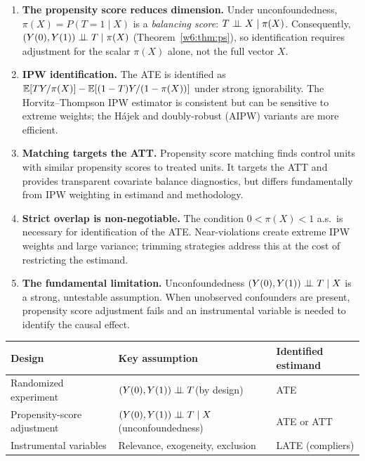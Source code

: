 \documentclass[master.tex]{subfiles}
\begin{document}
\begin{enumerate}
  \item \textbf{The propensity score reduces dimension.}  Under
    unconfoundedness, $\pi(X) = P(T{=}1 \mid X)$ is a \emph{balancing
    score}: $T \perp\!\!\!\perp X \mid \pi(X)$.  Consequently,
    $(Y(0),Y(1)) \perp\!\!\!\perp T \mid \pi(X)$ (Theorem~\ref{w6:thm:ps}), so
    identification requires adjustment for the scalar $\pi(X)$ alone, not
    the full vector $X$.

  \item \textbf{IPW identification.}  The ATE is identified as
    $\mathbb{E}[TY/\pi(X)] - \mathbb{E}[(1-T)Y/(1-\pi(X))]$ under strong ignorability.
    The Horvitz--Thompson IPW estimator is consistent but can be
    sensitive to extreme weights; the Hájek and doubly-robust (AIPW)
    variants are more efficient.

  \item \textbf{Matching targets the ATT.}  Propensity score matching
    finds control units with similar propensity scores to treated units.
    It targets the ATT and provides transparent covariate balance
    diagnostics, but differs fundamentally from IPW weighting in
    estimand and methodology.

  \item \textbf{Strict overlap is non-negotiable.}  The condition
    $0 < \pi(X) < 1$ a.s.\ is necessary for identification of the ATE.
    Near-violations create extreme IPW weights and large variance;
    trimming strategies address this at the cost of restricting the
    estimand.

  \item \textbf{The fundamental limitation.}  Unconfoundedness
    $(Y(0),Y(1)) \perp\!\!\!\perp T \mid X$ is a strong, untestable assumption.
    When unobserved confounders are present, propensity score adjustment
    fails and an instrumental variable is needed to identify the causal
    effect.
\end{enumerate}

\begin{tcolorbox}[defstyle, title={Comparison of Identification Strategies}]
\begin{center}
\renewcommand{\arraystretch}{1.4}
\begin{tabular}{p{3.5cm} p{4.5cm} p{4.5cm}}
\toprule
\textbf{Design} & \textbf{Key assumption} & \textbf{Identified estimand} \\
\midrule
Randomized experiment
  & $(Y(0),Y(1)) \perp\!\!\!\perp T$\newline (by design)
  & ATE \\[4pt]
Propensity-score adjustment
  & $(Y(0),Y(1)) \perp\!\!\!\perp T \mid X$\newline (unconfoundedness)
  & ATE or ATT \\[4pt]
Instrumental variables
  & Relevance, exogeneity, exclusion
  & LATE (compliers) \\
\bottomrule
\end{tabular}
\end{center}
\renewcommand{\arraystretch}{1}
\end{tcolorbox}
\end{document}

